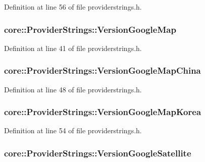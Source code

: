 Definition at line 56 of file providerstrings.\-h.

\hypertarget{group___o_p_map_widget_ga8c6875ce694aabbd5987f55b816cca2b}{
\subsubsection[{Version\-Google\-Map}]{ core\-::\-Provider\-Strings\-::\-Version\-Google\-Map}}\label{group___o_p_map_widget_ga8c6875ce694aabbd5987f55b816cca2b}


Definition at line 41 of file providerstrings.\-h.

\hypertarget{group___o_p_map_widget_gae854c1eca4887d3d875bc5f26ace02f2}{
\subsubsection[{Version\-Google\-Map\-China}]{ core\-::\-Provider\-Strings\-::\-Version\-Google\-Map\-China}}\label{group___o_p_map_widget_gae854c1eca4887d3d875bc5f26ace02f2}


Definition at line 48 of file providerstrings.\-h.

\hypertarget{group___o_p_map_widget_ga3487c2fed1d7acaa4c9d34e8b4afd9de}{
\subsubsection[{Version\-Google\-Map\-Korea}]{ core\-::\-Provider\-Strings\-::\-Version\-Google\-Map\-Korea}}\label{group___o_p_map_widget_ga3487c2fed1d7acaa4c9d34e8b4afd9de}


Definition at line 54 of file providerstrings.\-h.

\hypertarget{group___o_p_map_widget_gaeca979ef517e8ce202c7ce19d8f0c52f}{
\subsubsection[{Version\-Google\-Satellite}]{ core\-::\-Provider\-Strings\-::\-Version\-Google\-Satellite}}\label{group___o_p_map_widget_gaeca979ef517e8ce202c7ce19d8f0c52f}


